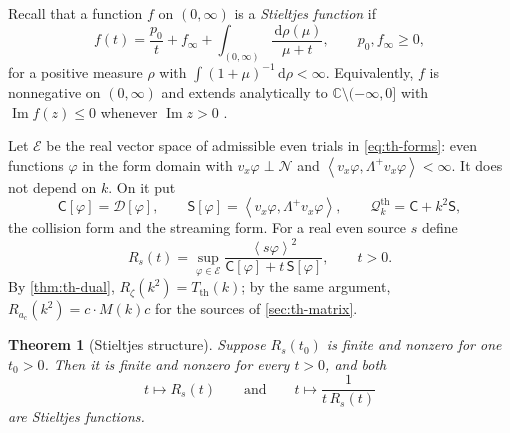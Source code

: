 \documentclass[11pt]{article}
\newcommand{\dd}{\,\mathrm d}
\newcommand{\av}[1]{\left\langle #1\right\rangle}
\newcommand{\D}{\mathcal D}
\newcommand{\Imag}{\operatorname{Im}}
\newcommand{\N}{\mathcal N}
\newcommand{\thr}{\mathrm{th}}
\newcommand{\Qth}{\mathcal Q^{\thr}}
\newcommand{\dual}[1]{\left\langle #1,\Lambda^+ #1\right\rangle}
\newtheorem{theorem}{Theorem}[section]
\theoremstyle{definition}
\theoremstyle{remark}
\numberwithin{equation}{section}
\begin{document}
Recall that a function $f$ on $(0,\infty)$ is a \emph{Stieltjes function}
if
\begin{equation}
 f(t)=\frac{p_0}{t}+f_\infty+\int_{(0,\infty)}\frac{\dd\rho(\mu)}{\mu+t},
 \qquad p_0,f_\infty\geq0,
 \label{eq:st-def}
\end{equation}
for a positive measure $\rho$ with $\int(1+\mu)^{-1}\dd\rho<\infty$.
Equivalently, $f$ is nonnegative on $(0,\infty)$ and extends analytically
to $\mathbb C\setminus(-\infty,0]$ with $\Imag f(z)\leq0$ whenever
$\Imag z>0$ \cite[Chapters~2 and~7]{SchillingSongVondracek2012}.

Let $\mathcal E$ be the real vector space of admissible even trials in
\eqref{eq:th-forms}: even functions $\varphi$ in the form domain with
$v_x\varphi\perp\N$ and $\dual{v_x\varphi}<\infty$. It does not depend on
$k$. On it put
\[
 \mathsf C[\varphi]=\D[\varphi],\qquad
 \mathsf S[\varphi]=\dual{v_x\varphi},\qquad
 \Qth_k=\mathsf C+k^2\mathsf S ,
\]
the collision form and the streaming form. For a real even source $s$
define
\begin{equation}
 R_s(t)=\sup_{\varphi\in\mathcal E}
   \frac{\av{s\varphi}^2}{\mathsf C[\varphi]+t\,\mathsf S[\varphi]},
 \qquad t>0 .
 \label{eq:st-R}
\end{equation}
By \cref{thm:th-dual}, $R_\zeta(k^2)=T_\thr(k)$; by the same argument,
$R_{a_c}(k^2)=c\cdot M(k)c$ for the sources of \cref{sec:th-matrix}.

\begin{theorem}[Stieltjes structure]\label{thm:stieltjes}
Suppose $R_s(t_0)$ is finite and nonzero for one $t_0>0$. Then it is finite
and nonzero for every $t>0$, and both
\[
 t\mapsto R_s(t)\qquad\text{and}\qquad t\mapsto\frac1{t\,R_s(t)}
\]
are Stieltjes functions.
\end{theorem}
\end{document}
